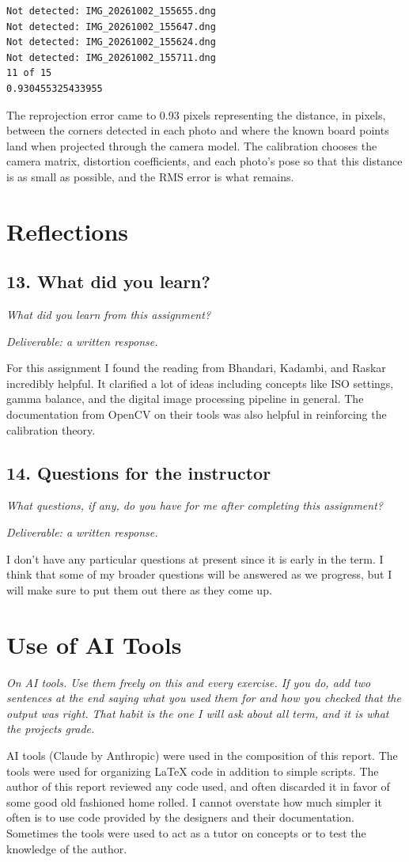 \documentclass[11pt]{article}
\newcommand{\task}[3]{\subsection*{#1}{\sloppy\noindent\textit{#2}\par}\smallskip\noindent\textit{Deliverable: #3}\par\medskip}
\begin{document}
\begin{lstlisting}
Not detected: IMG_20261002_155655.dng
Not detected: IMG_20261002_155647.dng
Not detected: IMG_20261002_155624.dng
Not detected: IMG_20261002_155711.dng
11 of 15
0.930455325433955
\end{lstlisting}

The reprojection error came to 0.93 pixels representing the distance, in pixels, between the corners detected in each photo and where the known board points land when projected through the camera model. The calibration chooses the camera matrix, distortion coefficients, and each photo's pose so that this distance is as small as possible, and the RMS error is what remains.

\section*{Reflections}

\task{13. What did you learn?}
{What did you learn from this assignment?}
{a written response.}

For this assignment I found the reading from Bhandari, Kadambi, and Raskar incredibly helpful. It clarified a lot of ideas including concepts like ISO settings, gamma balance, and the digital image processing pipeline in general. The documentation from OpenCV on their tools was also helpful in reinforcing the calibration theory.

\task{14. Questions for the instructor}
{What questions, if any, do you have for me after completing this assignment?}
{a written response.}

I don't have any particular questions at present since it is early in the term. I think that some of my broader questions will be answered as we progress, but I will make sure to put them out there as they come up.

\section*{Use of AI Tools}
\noindent\textit{On AI tools. Use them freely on this and every exercise. If you do, add two sentences at the end saying what you used them for and how you checked that the output was right. That habit is the one I will ask about all term, and it is what the projects grade.}\par\medskip
AI tools (Claude by Anthropic) were used in the composition of this report. The tools were used for organizing LaTeX code in addition to simple scripts. The author of this report reviewed any code used, and often discarded it in favor of some good old fashioned home rolled. I cannot overstate how much simpler it often is to use code provided by the designers and their documentation. Sometimes the tools were used to act as a tutor on concepts or to test the knowledge of the author.
\end{document}
